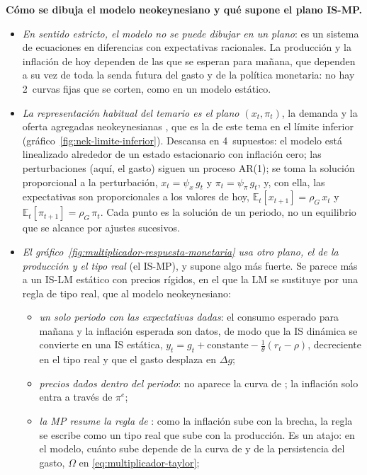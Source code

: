 \documentclass[11pt]{article}
\begin{document}
\begin{anotaciones}
\textbf{Cómo se dibuja el modelo neokeynesiano y qué supone el plano IS-MP.}
\begin{itemize}
\item \emph{En sentido estricto, el modelo no se puede dibujar en un plano}: es un sistema de ecuaciones en diferencias con expectativas racionales. La producción y la inflación de hoy dependen de las que se esperan para mañana, que dependen a su vez de toda la senda futura del gasto y de la política monetaria: no hay 2~curvas fijas que se corten, como en un modelo estático.
\item \emph{La representación habitual del temario es el plano $(x_t,\pi_t)$}, la demanda y la oferta agregadas neokeynesianas    , que es la de este tema en el límite inferior (gráfico~\ref{fig:nek-limite-inferior}). Descansa en 4~supuestos: el modelo está linealizado alrededor de un estado estacionario con inflación cero; las perturbaciones (aquí, el gasto) siguen un proceso AR(1); se toma la solución proporcional a la perturbación, $x_t=\psi_x\,g_t$ y $\pi_t=\psi_\pi\,g_t$, y, con ella, las expectativas son proporcionales a los valores de hoy, $\mathbb{E}_t[x_{t+1}]=\rho_G\,x_t$ y $\mathbb{E}_t[\pi_{t+1}]=\rho_G\,\pi_t$. Cada punto es la solución de un periodo, no un equilibrio que se alcance por ajustes sucesivos.
\item \emph{El gráfico~\ref{fig:multiplicador-respuesta-monetaria} usa otro plano, el de la producción y el tipo real} (el IS-MP), y supone algo más fuerte. Se parece más a un IS-LM estático con precios rígidos, en el que la LM se sustituye por una regla de tipo real, que al modelo neokeynesiano:
  \begin{itemize}
  \item \emph{un solo periodo con las expectativas dadas}: el consumo esperado para mañana y la inflación esperada son datos, de modo que la IS dinámica se convierte en una IS estática, $y_t=g_t+\text{constante}-\frac1\theta(r_t-\rho)$, decreciente en el tipo real y que el gasto desplaza en $\Delta g$;
  \item \emph{precios dados dentro del periodo}: no aparece la curva de ; la inflación solo entra a través de $\pi^e$;
  \item \emph{la MP resume la regla de }: como la inflación sube con la brecha, la regla se escribe como un tipo real que sube con la producción. Es un atajo: en el modelo, cuánto sube depende de la curva de  y de la persistencia del gasto, $\Omega$ en \eqref{eq:multiplicador-taylor};

\end{itemize}
\end{itemize}
\end{anotaciones}
\end{document}
